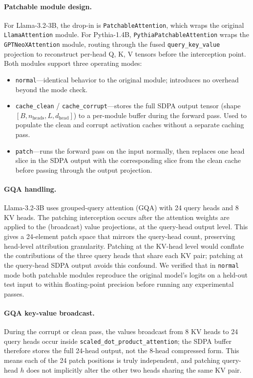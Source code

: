 \documentclass[11pt,a4paper]{article}
\begin{document}
\paragraph{Patchable module design.}
For Llama-3.2-3B, the drop-in is \texttt{PatchableAttention}, which wraps the
original \texttt{LlamaAttention} module. For Pythia-1.4B,
\texttt{PythiaPatchableAttention} wraps the \texttt{GPTNeoXAttention} module, routing
through the fused \texttt{query\_key\_value} projection to reconstruct per-head Q, K,
V tensors before the interception point. Both modules support three operating modes:

\begin{itemize}
  \item \texttt{normal}---identical behavior to the original module; introduces no
    overhead beyond the mode check.
  \item \texttt{cache\_clean} / \texttt{cache\_corrupt}---stores the full SDPA output
    tensor (shape $[B, n_\text{heads}, L, d_\text{head}]$) to a per-module buffer
    during the forward pass. Used to populate the clean and corrupt activation caches
    without a separate caching pass.
  \item \texttt{patch}---runs the forward pass on the input normally, then replaces
    one head slice in the SDPA output with the corresponding slice from the clean cache
    before passing through the output projection.
\end{itemize}

\paragraph{GQA handling.}
Llama-3.2-3B uses grouped-query attention (GQA) \citep{ainslie2023gqa} with 24 query
heads and 8 KV heads. The patching interception occurs after the attention weights are
applied to the (broadcast) value projections, at the query-head output level. This
gives a 24-element patch space that mirrors the query-head count, preserving head-level
attribution granularity. Patching at the KV-head level would conflate the
contributions of the three query heads that share each KV pair; patching at the
query-head SDPA output avoids this confound. We verified that in \texttt{normal} mode
both patchable modules reproduce the original model's logits on a held-out test input
to within floating-point precision before running any experimental passes.

\paragraph{GQA key-value broadcast.}
During the corrupt or clean pass, the values broadcast from 8 KV heads to 24 query
heads occur inside \texttt{scaled\_dot\_product\_attention}; the SDPA buffer therefore
stores the full 24-head output, not the 8-head compressed form. This means each of the
24 patch positions is truly independent, and patching query-head $h$ does not
implicitly alter the other two heads sharing the same KV pair.
\end{document}
